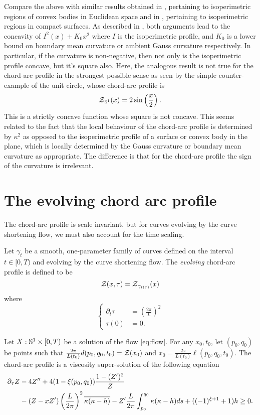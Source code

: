 \documentclass[a4paper, 12pt]{amsart}
\begin{document}
\begin{rem}
Compare the above with similar results obtained in \cite{MR1674097}, pertaining to isoperimetric regions of convex bodies in Euclidean space and in \cite{MR875084}, pertaining to isoperimetric regions in compact surfaces. As described in \cite{pbthesis}, both arguments lead to the concavity of $I^2(x) + K_0 x^2$ where $I$ is the isoperimetric profile, and $K_0$ is a lower bound on boundary mean curvature or ambient Gauss curvature respectively. In particular, if the curvature is non-negative, then not only is the isoperimetric profile concave, but it's square also. Here, the analogous result is not true for the chord-arc profile in the strongest possible sense as seen by the simple counter-example of the unit circle, whose chord-arc profile is 
\[
\chordarcprofile_{\S^1} (x) = 2 \sin \left(\frac{x}{2}\right).
\]
This is a strictly concave function whose square is not concave. This seems related to the fact that the local behaviour of the chord-arc profile is determined by $\kappa^2$ as opposed to the isoperimetric profile of a surface or convex body in the plane, which is locally determined by the Gauss curvature or boundary mean curvature as appropriate. The difference is that for the chord-arc profile the sign of the curvature is irrelevant.
\end{rem}

\section{The evolving chord arc profile}
\label{sec:evolving_chordarc}

The chord-arc profile is scale invariant, but for curves evolving by the curve shortening flow, we must also account for the time scaling.

\begin{defn}
\label{defn:timeprofile}
Let \(\gamma_t\) be a smooth, one-parameter family of curves defined on the interval \(t \in [0, T)\) and evolving by the curve shortening flow. The \emph{evolving} chord-arc profile is defined to be
\[
\chordarcprofile(x, \tau) = \chordarcprofile_{\gamma_{t(\tau)}} (x)
\]
where
\[
\begin{cases}
\partial_t \tau &= \left(\frac{2\pi}{L}\right)^2 \\
\tau(0) &= 0.
\end{cases}
\]
\end{defn}

\begin{thm}
\label{thm:viscosity}
Let $X: \S^1\times [0,T)$ be a solution of the flow \eqref{eq:flow}. For any \(x_0, t_0\), let $(p_0,q_0)$ be points such that $\tfrac{2\pi}{L(t_0)} d(p_0, q_0, t_0) = \chordarcprofile(x_0)$ and $x_0 = \frac{2\pi}{L(t_0)} \ell(p_0, q_0, t_0)$. The chord-arc profile is a viscosity super-solution of the following equation
\[
\begin{split}
\partial_{\tau} Z & -4 Z'' + 4(1-\xi(p_0,q_0)) \frac{1 - (Z')^2}{Z} \\
& - (Z - x Z') \left(\frac{L}{2\pi}\right)^2 \avg{\kappa(\kappa-h)} - Z' \frac{L}{2\pi} \int_{p_0}^{q_0} \kappa(\kappa-h) ds + ((-1)^{\xi+1} + 1)h \geq 0.
\end{split}
\]
\end{thm}
\end{document}
